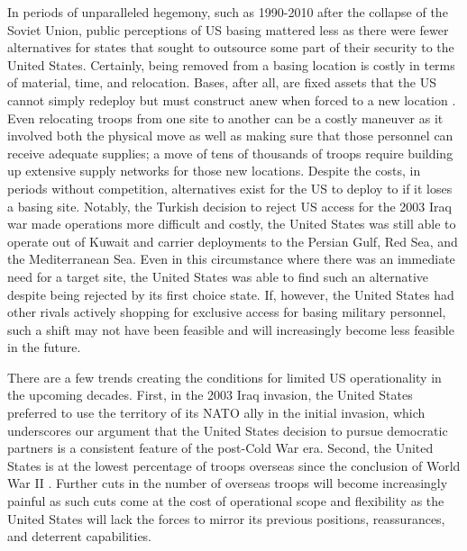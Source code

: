 {	In periods of unparalleled hegemony, such as 1990-2010 after the collapse of the Soviet Union, public perceptions of US basing mattered less as there were fewer alternatives for states that sought to outsource some part of their security to the United States. Certainly, being removed from a basing location is costly in terms of material, time, and relocation. Bases, after all, are fixed assets that the US cannot simply redeploy but must construct anew when forced to a new location \cite{Allen2011}. Even relocating troops from one site to another can be a costly maneuver as it involved both the physical move as well as making sure that those personnel can receive adequate supplies; a move of tens of thousands of troops require building up extensive supply networks for those new locations. Despite the costs, in periods without competition, alternatives exist for the US to deploy to if it loses a basing site. Notably, the Turkish decision to reject US access for the 2003 Iraq war made operations more difficult and costly, the United States was still able to operate out of Kuwait and carrier deployments to the Persian Gulf, Red Sea, and the Mediterranean Sea. Even in this circumstance where there was an immediate need for a target site, the United States was able to find such an alternative despite being rejected by its first choice state. If, however, the United States had other rivals actively shopping for exclusive access for basing military personnel, such a shift may not have been feasible and will increasingly become less feasible in the future. 
	
	There are a few trends creating the conditions for limited US operationality in the upcoming decades. First, in the 2003 Iraq invasion, the United States preferred to use the territory of its NATO ally in the initial invasion, which underscores our argument that the United States decision to pursue democratic partners is a consistent feature of the post-Cold War era. Second, the United States is at the lowest percentage of troops overseas since the conclusion of World War II \cite{Huston1988,Warren2016,Allen2021a,Allen2021b}. Further cuts in the number of overseas troops will become increasingly painful as such cuts come at the cost of operational scope and flexibility as the United States will lack the forces to mirror its previous positions, reassurances, and deterrent capabilities. 
	
}
